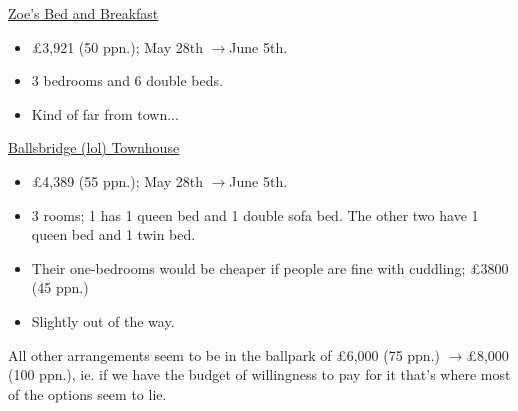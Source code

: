 \documentclass[12pt]{article}
\renewcommand{\to}{$\rightarrow$}
\newcommand{\cost}[2]{\pounds#1 (#2 ppn.)}
\begin{document}
	\href{https://www.airbnb.co.uk/rooms/7305892?adults=10&children=0&infants=0&check_in=2022-05-28&check_out=2022-06-05&federated_search_id=7416d1fc-62a0-4764-a1fa-8f70ded658be&source_impression_id=p3_1648312760_KodxjaW24K6A1UKj}{Zoe's Bed and Breakfast}
	\begin{itemize}
		\item \cost{3,921}{50}; May 28th \to June 5th.
		\item 3 bedrooms and 6 double beds.
		\item Kind of far from town...
	\end{itemize}
	\href{https://www.booking.com/hotel/ie/merrion-road-ballsbridge.html?aid=355028;sid=3f62ec944d118827daff72c411262409;all_sr_blocks=188261006_92403605_0_0_0%2C188261002_348859887_0_0_0%2C188261002_348859887_0_0_0;checkin=2022-05-28;checkout=2022-06-05;dest_id=-1502554;dest_type=city;dist=0;group_adults=10;group_children=0;hapos=4;highlighted_blocks=188261006_92403605_0_0_0%2C188261002_348859887_0_0_0%2C188261002_348859887_0_0_0;hpos=4;matching_block_id=188261006_92403605_0_0_0;no_rooms=1;req_adults=10;req_children=0;room1=A%2CA%2CA%2CA%2CA%2CA%2CA%2CA%2CA%2CA;sb_price_type=total;sr_order=popularity;sr_pri_blocks=188261006_92403605_0_0_0__204900%2C188261002_348859887_0_0_0__161117%2C188261002_348859887_0_0_0__161117;srepoch=1648312598;srpvid=4f9e74ca2749018e;type=total;ucfs=1&#hotelTmpl}{Ballsbridge (lol) Townhouse}
	\begin{itemize}
		\item \cost{4,389}{55}; May 28th \to June 5th.
		\item 3 rooms; 1 has 1 queen bed and 1 double sofa bed. The other two have 1 queen bed and 1 twin bed.
		\item Their one-bedrooms would be cheaper if people are fine with cuddling; \cost{3800}{45}
		\item Slightly out of the way.
	\end{itemize}
	All other arrangements seem to be in the ballpark of \cost{6,000}{75} \to \cost{8,000}{100}, ie. if we have the budget of willingness to pay for it that's where most of the options seem to lie.
\end{document}

